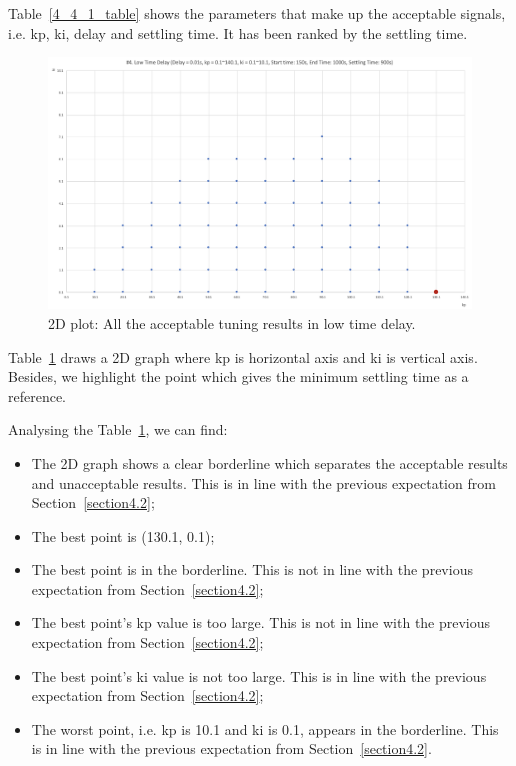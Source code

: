 Table~\ref{4_4_1_table} shows the parameters that make up the acceptable signals, i.e. kp, ki, delay and settling time. It has been ranked by the settling time.  

\begin{figure}[htbp]
\centering
\includegraphics[width = .819\textwidth]{figure/4_4_1_2d.png}
\caption{2D plot: All the acceptable tuning results in low time delay.}
\label{4_4_1_2d}
\end{figure}

Table~\ref{4_4_1_2d} draws a 2D graph where kp is horizontal axis and ki is vertical axis. Besides, we highlight the point which gives the minimum settling time as a reference. 

Analysing the Table~\ref{4_4_1_2d}, we can find: 

\begin{itemize}
\item The 2D graph shows a clear borderline which separates the acceptable results and unacceptable results. This is in line with the previous expectation from Section~\ref{section4.2}; 

\item The best point is (130.1, 0.1); 

\item The best point is in the borderline.  This is not in line with the previous expectation from Section~\ref{section4.2}; 

\item The best point’s kp value is too large. This is not in line with the previous expectation from Section~\ref{section4.2}; 

\item The best point's ki value is not too large.  This is in line with the previous expectation from Section~\ref{section4.2}; 

\item The worst point, i.e. kp is 10.1 and ki is 0.1, appears in the borderline. This is in line with the previous expectation from Section~\ref{section4.2}. 
\end{itemize}

